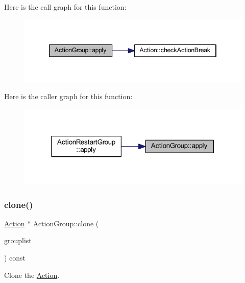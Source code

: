 Here is the call graph for this function\+:
\nopagebreak
\begin{figure}[H]
\begin{center}
\leavevmode
\includegraphics[width=346pt]{class_action_group_aaaab0b0f5c7a14752cd57478de2e9290_cgraph}
\end{center}
\end{figure}
Here is the caller graph for this function\+:
\nopagebreak
\begin{figure}[H]
\begin{center}
\leavevmode
\includegraphics[width=318pt]{class_action_group_aaaab0b0f5c7a14752cd57478de2e9290_icgraph}
\end{center}
\end{figure}
\mbox{\label{class_action_group_ace0724b13474c6c098eb25aee96dd1d6}} 
\subsubsection{\texorpdfstring{clone()}{clone()}}
{\footnotesize\ttfamily \mbox{\hyperlink{class_action}{Action}} $\ast$ Action\+Group\+::clone (\begin{DoxyParamCaption}\item[{const \mbox{\hyperlink{class_action_group_list}{Action\+Group\+List}} \&}]{grouplist }\end{DoxyParamCaption}) const\hspace{0.3cm}{\ttfamily [virtual]}}



Clone the \mbox{\hyperlink{class_action}{Action}}. 

